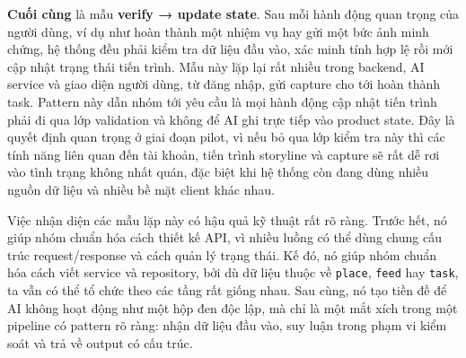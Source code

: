 \textbf{Cuối cùng} là mẫu \textbf{verify → update state}. Sau mỗi hành động
quan trọng của người dùng, ví dụ như hoàn thành một nhiệm vụ hay gửi một
bức ảnh minh chứng, hệ thống đều phải kiểm tra dữ liệu đầu vào, xác minh
tính hợp lệ rồi mới cập nhật trạng thái tiến trình. Mẫu này lặp lại rất
nhiều trong backend, AI service và giao diện người dùng, từ đăng nhập,
gửi capture cho tới hoàn thành task. Pattern này dẫn nhóm tới yêu cầu là
mọi hành động cập nhật tiến trình phải đi qua lớp validation và không để
AI ghi trực tiếp vào product state. Đây là quyết định quan trọng ở
giai đoạn pilot, vì nếu bỏ qua lớp kiểm tra này thì các tính năng liên
quan đến tài khoản, tiến trình storyline và capture sẽ rất dễ rơi vào
tình trạng không nhất quán, đặc biệt khi hệ thống còn đang dùng nhiều
nguồn dữ liệu và nhiều bề mặt client khác nhau.

Việc nhận diện các mẫu lặp này có hậu quả kỹ thuật rất rõ ràng. Trước hết, nó giúp nhóm chuẩn hóa cách thiết kế API, vì nhiều luồng có thể
dùng chung cấu trúc request/response và cách quản lý trạng thái. Kế đó, nó giúp nhóm chuẩn hóa cách viết service và repository, bởi dù dữ
liệu thuộc về \texttt{place}, \texttt{feed} hay \texttt{task}, ta vẫn
có thể tổ chức theo các tầng rất giống nhau. Sau cùng, nó tạo tiền đề để
AI không hoạt động như một hộp đen độc lập, mà chỉ là một mắt xích trong
một pipeline có pattern rõ ràng: nhận dữ liệu đầu vào, suy luận trong
phạm vi kiểm soát và trả về output có cấu trúc.
